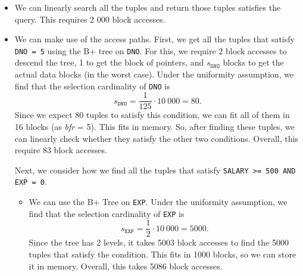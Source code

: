 \documentclass[a4paper, openany]{memoir}
\theoremstyle{definition}
\begin{document}
\begin{answer}
    \begin{itemize}
        \item We can linearly search all the tuples and return those tuples satisfies the query. This requires 2 000 block accesses.
        
        \item We can make use of the access paths. First, we get all the tuples that satisfy \texttt{DNO = 5} using the B+ tree on \texttt{DNO}. For this, we require 2 block accesses to descend the tree, 1 to get the block of pointers, and $s_{\texttt{DNO}}$ blocks to get the actual data blocks (in the worst case). Under the uniformity assumption, we find that the selection cardinality of \texttt{DNO} is 
        \[s_{\texttt{DNO}} = \frac{1}{125} \cdot 10 \ 000 = 80.\]
        Since we expect 80 tuples to satisfy this condition, we can fit all of them in 16 blocks (as \textit{bfr} = 5). This fits in memory. So, after finding these tuples, we can linearly check whether they satisfy the other two conditions. Overall, this require 83 block accesses.

        Next, we consider how we find all the tuples that satisfy \texttt{SALARY >= 500 AND EXP = 0}.
        \begin{itemize}
            \item We can use the B+ Tree on \texttt{EXP}. Under the uniformity assumption, we find that the selection cardinality of \texttt{EXP} is
            \[s_{\texttt{EXP}} = \frac{1}{2} \cdot 10 \ 000 = 5000.\]
            Since the tree has 2 levels, it takes 5003 block accesses to find the 5000 tuples that satisfy the condition. This fits in 1000 blocks, so we can store it in memory. Overall, this takes 5086 block accesses.


\end{itemize}
\end{itemize}
\end{answer}
\end{document}
